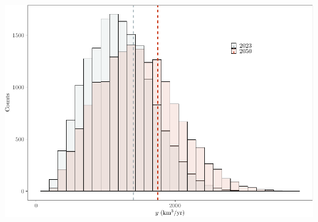 \documentclass[
  11pt,
]{article}
\begin{document}
\includegraphics{code_fallacies_water_crisis_files/figure-latex/all_model-2.pdf}
\end{document}
